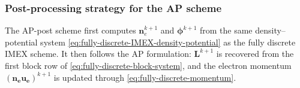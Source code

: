 \documentclass[pdflatex,final,10pt]{article}
\newcommand{\Del}[1]{#1}
\begin{document}
\subsubsection{Post-processing strategy for the AP scheme}


The AP-post scheme first computes
$\boldsymbol{n}_e^{k+1}$ and $\boldsymbol{\phi}^{k+1}$
from the same density--potential system
\eqref{eq:fully-discrete-IMEX-density-potential} as the fully discrete
IMEX scheme. It then follows the AP formulation:
$\boldsymbol{L}^{k+1}$ is recovered from the first block row of
\eqref{eq:fully-discrete-block-system}, and the electron momentum
$\boldsymbol{(n_eu_e)}^{k+1}$ is updated through
\eqref{eq:fully-discrete-momentum}.
\end{document}
